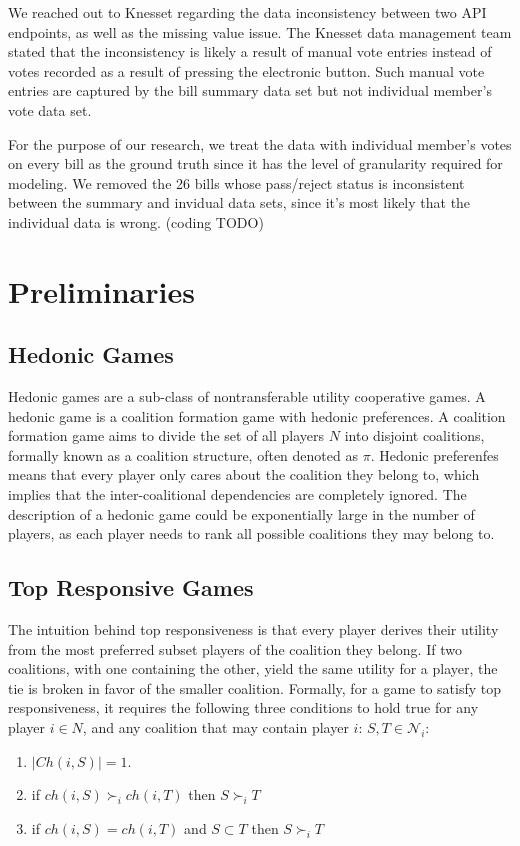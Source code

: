 \documentclass[letterpaper]{article} %
\begin{document}
We reached out to Knesset regarding the data inconsistency between two API endpoints, as well as the missing value issue. The Knesset data management team stated that the inconsistency is likely a result of manual vote entries instead of votes recorded as a result of pressing the electronic button. Such manual vote entries are captured by the bill summary data set but not individual member's vote data set.

For the purpose of our research, we treat the data with individual member's votes on every bill as the ground truth since it has the level of granularity required for modeling.  We removed the 26 bills whose pass/reject status is inconsistent between the summary and invidual data sets, since it's most likely that the individual data is wrong. (coding TODO)

\section{Preliminaries}

\subsection{Hedonic Games}
Hedonic games are a sub-class of nontransferable utility cooperative games. A hedonic game is a coalition formation game with hedonic preferences. A coalition formation game aims to divide the set of all players $N$ into disjoint coalitions, formally known as a coalition structure, often denoted as $\pi$. Hedonic preferenfes means that every player only cares about the coalition they belong to, which implies that the inter-coalitional dependencies are completely ignored. The description of a hedonic game could be exponentially large in the number of players, as each player needs to rank all possible coalitions they may belong to.

\subsection{Top Responsive Games}
The intuition behind top responsiveness is that every player derives their utility from the most preferred subset players of the coalition they belong. If two coalitions, with one containing the other, yield the same utility for a player, the tie is broken in favor of the smaller coalition. Formally, for a game to satisfy top responsiveness, it requires the following three conditions to hold true for any player $i \in N$, and any coalition that may contain player $i$: $S, T \in \mathcal{N}_i$:
\begin{enumerate}
  \item $|Ch(i, S)| = 1$.
  \item if $ch(i, S) \succ_i ch(i, T)$ then $S \succ_i T$
  \item if $ch(i, S) = ch(i, T)$ and $S \subset T$ then $S \succ_i T$
\end{enumerate}
\end{document}
